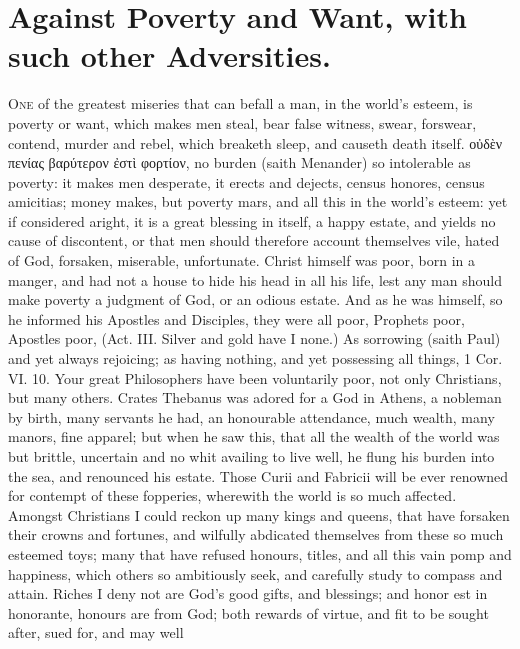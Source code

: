 {%

\section{Against Poverty and Want, with such other Adversities.}

\lettrine{O}{ne} of the greatest miseries that can befall a man, in the world's
esteem, is poverty or want, which makes men steal, bear false witness,
swear, forswear, contend, murder and rebel, which breaketh sleep, and
causeth death itself. \textgreek{οὐδὲν πενίας βαρύτερον ἐστὶ φορτίον}, no burden
(saith Menander) so intolerable as poverty: it makes men
desperate, it erects and dejects, census honores, census amicitias;
money makes, but poverty mars, \etc{} and all this in the world's esteem:
yet if considered aright, it is a great blessing in itself, a happy
estate, and yields no cause of discontent, or that men should therefore
account themselves vile, hated of God, forsaken, miserable,
unfortunate. Christ himself was poor, born in a manger, and had not a
house to hide his head in all his life, lest any man should make
poverty a judgment of God, or an odious estate. And as he was himself,
so he informed his Apostles and Disciples, they were all poor, Prophets
poor, Apostles poor, (Act. III. Silver and gold have I none.) As
sorrowing (saith Paul) and yet always rejoicing; as having nothing, and
yet possessing all things, 1 Cor. VI. 10. Your great Philosophers have
been voluntarily poor, not only Christians, but many others. Crates
Thebanus was adored for a God in Athens, a nobleman by birth,
many servants he had, an honourable attendance, much wealth, many
manors, fine apparel; but when he saw this, that all the wealth of the
world was but brittle, uncertain and no whit availing to live well, he
flung his burden into the sea, and renounced his estate. Those Curii
and Fabricii will be ever renowned for contempt of these fopperies,
wherewith the world is so much affected. Amongst Christians I could
reckon up many kings and queens, that have forsaken their crowns and
fortunes, and wilfully abdicated themselves from these so much esteemed
toys; many that have refused honours, titles, and all this vain
pomp and happiness, which others so ambitiously seek, and carefully
study to compass and attain. Riches I deny not are God's good gifts,
and blessings; and honor est in honorante, honours are from God; both
rewards of virtue, and fit to be sought after, sued for, and may well
}
